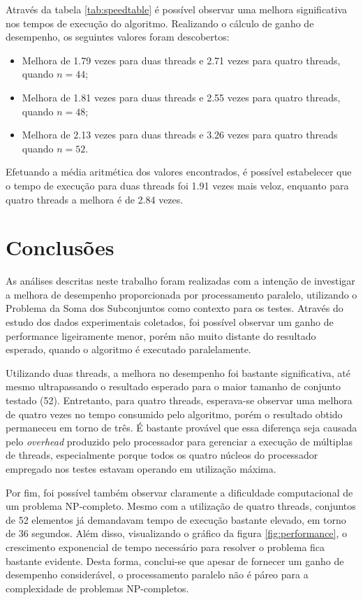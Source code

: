 \documentclass[12pt]{article}
\begin{document}
Através da tabela \ref{tab:speedtable} é possível observar uma melhora significativa nos tempos de execução do algoritmo. Realizando o cálculo de ganho de desempenho, os seguintes valores foram descobertos:

\begin{itemize}
    \item Melhora de 1.79 vezes para duas threads e 2.71 vezes para quatro threads, quando $n = 44$;
    \item Melhora de 1.81 vezes para duas threads e 2.55 vezes para quatro threads, quando $n = 48$;
    \item Melhora de 2.13 vezes para duas threads e 3.26 vezes para quatro threads quando $n = 52$.
\end{itemize}

Efetuando a média aritmética dos valores encontrados, é possível estabelecer que o tempo de execução para duas threads foi 1.91 vezes mais veloz, enquanto para quatro threads a melhora é de 2.84 vezes.

\section{Conclusões} \label{sec:conclusions}

As análises descritas neste trabalho foram realizadas com a intenção de investigar a melhora de desempenho proporcionada por processamento paralelo, utilizando o Problema da Soma dos Subconjuntos como contexto para os testes. Através do estudo dos dados experimentais coletados, foi possível observar um ganho de performance ligeiramente menor, porém não muito distante do resultado esperado, quando o algoritmo é executado paralelamente.

Utilizando duas threads, a melhora no desempenho foi bastante significativa, até mesmo ultrapassando o resultado esperado para o maior tamanho de conjunto testado (52). Entretanto, para quatro threads, esperava-se observar uma melhora de quatro vezes no tempo consumido pelo algoritmo, porém o resultado obtido permaneceu em torno de três. É bastante provável que essa diferença seja causada pelo \textit{overhead} produzido pelo processador para gerenciar a execução de múltiplas de threads, especialmente porque todos os quatro núcleos do processador empregado nos testes estavam operando em utilização máxima.

Por fim, foi possível também observar claramente a dificuldade computacional de um problema NP-completo. Mesmo com a utilização de quatro threads, conjuntos de 52 elementos já demandavam tempo de execução bastante elevado, em torno de 36 segundos. Além disso, visualizando o gráfico da figura \ref{fig:performance}, o crescimento exponencial de tempo necessário para resolver o problema fica bastante evidente. Desta forma, conclui-se que apesar de fornecer um ganho de desempenho considerável, o processamento paralelo não é páreo para a complexidade de problemas NP-completos.



\end{document}
